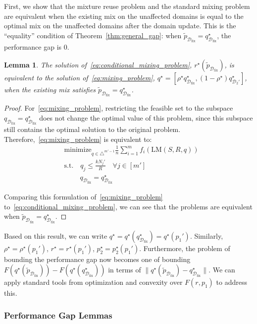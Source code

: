 \documentclass[table]{ai2style/ai2}
\newtheorem{lemma}{Lemma}
\newcommand{\D}[0]{\mathcal{D}}
\newcommand{\LM}[0]{\text{LM}}
\newcommand{\Dfix}[0]{\mathcal{D}_{\text{fix}}}
\begin{document}
First, we show that the mixture reuse problem and the standard mixing problem are equivalent when the existing mix on the unaffected domains is equal to the optimal mix on the unaffected domains after the domain update. This is the ``equality'' condition of Theorem~\ref{thm:general_gap}: when $\tilde{p}_{\Dfix} = q^\star_{\Dfix}$, the performance gap is $0$.

\begin{lemma}\label{lemma:conditional_standard_equivalence}
The solution of~\eqref{eq:conditional_mixing_problem}, $r^\star(\tilde{p}_{\Dfix})$, is equivalent to the solution of~\eqref{eq:mixing_problem}, $q^\star = [\rho^\star q^\star_{\Dfix}, (1 - \rho^\star) q^\star_{\D_2'}]$, when the existing mix satisfies $\tilde{p}_{\Dfix} = q^\star_{\Dfix}$. 
\end{lemma}

\begin{proof}
For~\eqref{eq:mixing_problem}, restricting the feasible set to the subspace $q_{\Dfix} = q^\star_{\Dfix}$ does not change the optimal value of this problem, since this subspace still contains the optimal solution to the original problem. Therefore,~\eqref{eq:mixing_problem} is equivalent to:
\begin{align*}
    &\text{minimize}_{q \in \triangle^{m'-1}}  \frac{1}{n} \sum_{i = 1}^m f_i(\LM(S, R, q)) \\
    &\text{s.t.} \quad  q_j \le \frac{k N_j'}{R} \quad \forall j \in [m'] \nonumber \\
    &  \qquad \; q_{\Dfix} = q^\star_{\Dfix} \nonumber 
\end{align*}

Comparing this formulation of~\eqref{eq:mixing_problem} to~\eqref{eq:conditional_mixing_problem}, we can see that the problems are equivalent when $\tilde{p}_{\Dfix} = q^\star_{\Dfix}$.
\end{proof}

Based on this result, we can write $q^\star = q^\star(q_{\Dfix}^\star) = q^\star(p_1')$. Similarly, $\rho^\star = \rho^\star(p_1')$, $r^\star = r^\star(p_1')$, $p_2^\star = p_2^\star(p_1')$. Furthermore, the problem of bounding the performance gap now becomes one of bounding $F(q^\star(\tilde{p}_{\Dfix})) - F(q^\star(q^\star_{\Dfix}))$ in terms of $\|q^\star(\tilde{p}_{\Dfix}) - q^\star_{\Dfix} \|$. We can apply standard tools from optimization and convexity over $F(r, p_1)$ to address this.

\subsubsection{Performance Gap Lemmas}
\end{document}
